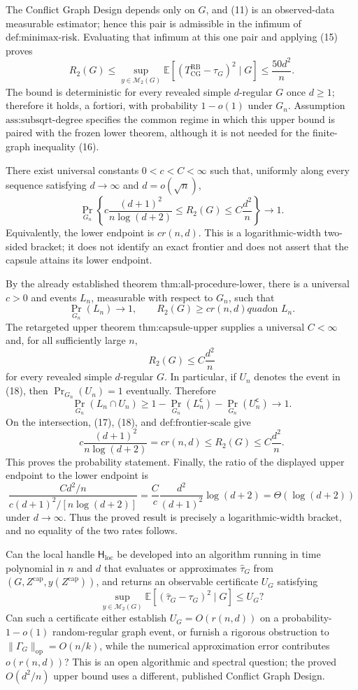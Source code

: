 The Conflict Graph Design depends only on \(G\), and (11) is an observed-data measurable estimator; hence this pair is admissible in the infimum of \(\text{def:minimax-risk}\).  Evaluating that infimum at this one pair and applying (15) proves
\[
R_2(G)\le
\sup_{y\in\mathcal M_2(G)}
\mathbb E[(T_{\mathrm{CG}}^{\mathrm{RB}}-\tau_G)^2\mid G]
\le\frac{50d^2}{n}. \tag{16}
\]
The bound is deterministic for every revealed simple \(d\)-regular \(G\) once \(d\ge1\); therefore it holds, a fortiori, with probability \(1-o(1)\) under \(G_n\).  Assumption \(\text{ass:subsqrt-degree}\) specifies the common regime in which this upper bound is paired with the frozen lower theorem, although it is not needed for the finite-graph inequality (16).

There exist universal constants \(0<c<C<\infty\) such that, uniformly along every sequence satisfying \(d\to\infty\) and \(d=o(\sqrt n)\),
\[
\Pr_{G_n}\!\left\{
c\frac{(d+1)^2}{n\log(d+2)}
\le R_2(G)\le C\frac{d^2}{n}
\right\}\longrightarrow1.
\]
Equivalently, the lower endpoint is \(c r(n,d)\).  This is a logarithmic-width two-sided bracket; it does not identify an exact frontier and does not assert that the capsule attains its lower endpoint.

By the already established theorem \(\text{thm:all-procedure-lower}\), there is a universal \(c>0\) and events \(L_n\), measurable with respect to \(G_n\), such that
\[
\Pr_{G_n}(L_n)\to1,
\qquad
R_2(G)\ge c r(n,d)quad\text{on }L_n. \tag{17}
\]
The retargeted upper theorem \(\text{thm:capsule-upper}\) supplies a universal \(C<\infty\) and, for all sufficiently large \(n\),
\[
R_2(G)\le C\frac{d^2}{n} \tag{18}
\]
for every revealed simple \(d\)-regular \(G\).  In particular, if \(U_n\) denotes the event in (18), then \(\Pr_{G_n}(U_n)=1\) eventually.  Therefore
\[
\Pr_{G_n}(L_n\cap U_n)
\ge1-\Pr_{G_n}(L_n^{\mathsf c})-\Pr_{G_n}(U_n^{\mathsf c})
\longrightarrow1. \tag{19}
\]
On the intersection, (17), (18), and \(\text{def:frontier-scale}\) give
\[
c\frac{(d+1)^2}{n\log(d+2)}
=c r(n,d)\le R_2(G)\le C\frac{d^2}{n}. \tag{20}
\]
This proves the probability statement.  Finally, the ratio of the displayed upper endpoint to the lower endpoint is
\[
\frac{Cd^2/n}{c(d+1)^2/[n\log(d+2)]}
=\frac{C}{c}\frac{d^2}{(d+1)^2}\log(d+2)
=\Theta(\log(d+2))
\]
under \(d\to\infty\).  Thus the proved result is precisely a logarithmic-width bracket, and no equality of the two rates follows.

Can the local handle \(\mathsf H_{\mathrm{loc}}\) be developed into an algorithm running in time polynomial in \(n\) and \(d\) that evaluates or approximates \(\widehat\tau_G\) from \((G,Z^{\mathrm{cap}},y(Z^{\mathrm{cap}}))\), and returns an observable certificate \(U_G\) satisfying
\[
\sup_{y\in\mathcal M_2(G)}
\mathbb E[(\widehat\tau_G-\tau_G)^2\mid G]\le U_G?
\]
Can such a certificate either establish \(U_G=O(r(n,d))\) on a probability-\(1-o(1)\) random-regular graph event, or furnish a rigorous obstruction to \(\|\Gamma_G\|_{\mathrm{op}}=O(n/k)\), while the numerical approximation error contributes \(o(r(n,d))\)?  This is an open algorithmic and spectral question; the proved \(O(d^2/n)\) upper bound uses a different, published Conflict Graph Design.
